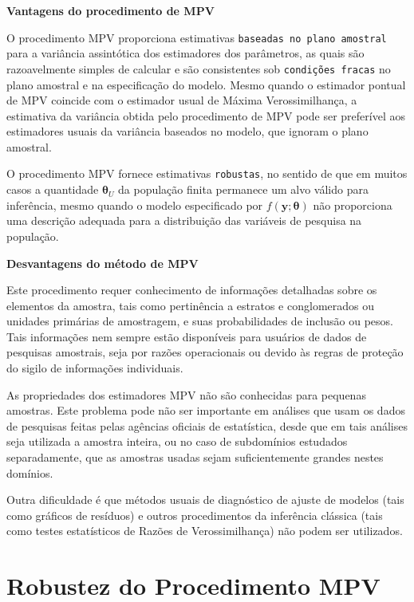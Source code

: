 \documentclass[]{book}
\theoremstyle{definition}
\theoremstyle{definition}
\theoremstyle{definition}
\theoremstyle{remark}
\begin{document}
\textbf{Vantagens do procedimento de MPV}

O procedimento MPV proporciona estimativas
\texttt{baseadas\ no\ plano\ amostral} para a variância assintótica dos
estimadores dos parâmetros, as quais são razoavelmente simples de
calcular e são consistentes sob \texttt{condições\ fracas} no plano
amostral e na especificação do modelo. Mesmo quando o estimador pontual
de MPV coincide com o estimador usual de Máxima Verossimilhança, a
estimativa da variância obtida pelo procedimento de MPV pode ser
preferível aos estimadores usuais da variância baseados no modelo, que
ignoram o plano amostral.

O procedimento MPV fornece estimativas \texttt{robustas}, no sentido de
que em muitos casos a quantidade \(\mathbf{\theta }_{U}\) da população
finita permanece um alvo válido para inferência, mesmo quando o modelo
especificado por \(f\left( \mathbf{y};\mathbf{\theta }\right)\) não
proporciona uma descrição adequada para a distribuição das variáveis de
pesquisa na população.

\textbf{Desvantagens do método de MPV}

Este procedimento requer conhecimento de informações detalhadas sobre os
elementos da amostra, tais como pertinência a estratos e conglomerados
ou unidades primárias de amostragem, e suas probabilidades de inclusão
ou pesos. Tais informações nem sempre estão disponíveis para usuários de
dados de pesquisas amostrais, seja por razões operacionais ou devido às
regras de proteção do sigilo de informações individuais.

As propriedades dos estimadores MPV não são conhecidas para pequenas
amostras. Este problema pode não ser importante em análises que usam os
dados de pesquisas feitas pelas agências oficiais de estatística, desde
que em tais análises seja utilizada a amostra inteira, ou no caso de
subdomínios estudados separadamente, que as amostras usadas sejam
suficientemente grandes nestes domínios.

Outra dificuldade é que métodos usuais de diagnóstico de ajuste de
modelos (tais como gráficos de resíduos) e outros procedimentos da
inferência clássica (tais como testes estatísticos de Razões de
Verossimilhança) não podem ser utilizados.

\section{Robustez do Procedimento
MPV}\label{robustez-do-procedimento-mpv}
\end{document}
